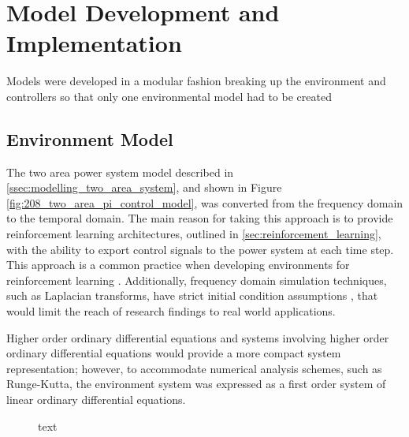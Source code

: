 \section{Model Development and Implementation}
Models were developed in a modular fashion breaking up the environment and controllers so that only one environmental model had to be created


\subsection{Environment Model} \label{ssec:env_modelling}
The two area power system model described in \textsection \ref{ssec:modelling_two_area_system}, and shown in Figure \ref{fig:208_two_area_pi_control_model}, was converted from the frequency domain to the temporal domain. The main reason for taking this approach is to provide reinforcement learning architectures, outlined in \textsection \ref{sec:reinforcement_learning}, with the ability to export control signals to the power system at each time step. This approach is a common practice when developing environments for reinforcement learning \cite{Brockman2016}. Additionally, frequency domain simulation techniques, such as Laplacian transforms, have strict initial condition assumptions \cite{Ogat2010}, that would limit the reach of research findings to real world applications.

Higher order ordinary differential equations and systems involving higher order ordinary differential equations would provide a more compact system representation; however, to accommodate numerical analysis schemes, such as Runge-Kutta, the environment system was expressed as a first order system of linear ordinary differential equations.

\begin{figure}[h]
	\centering
	\resizebox{\textwidth}{!}{}
	\caption{text}
	\label{4101_two_area_power_system_temporal_model}
\end{figure}

